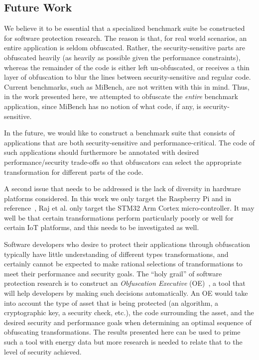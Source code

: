 \subsection{Future Work}
We believe it to be essential that a specialized benchmark suite be constructed for software protection research. The reason is that, for real world scenarios, an entire application is seldom obfuscated. Rather, the security-sensitive parts are obfuscated heavily (as heavily as possible given the performance constraints), whereas the remainder of the code is either left un-obfuscated, or receives a thin layer of obfuscation to blur the lines between security-sensitive and regular code. Current benchmarks, such as MiBench, are not written with this in mind. Thus, in the work presented here, we attempted to obfuscate the {\em entire} benchmark application, since MiBench has no notion of what code, if any, is security-sensitive. 

In the future, we would like to construct a benchmark suite that consists of applications that are both security-sensitive and performance-critical. The code of such applications should furthermore be annotated with desired performance/security trade-offs so that obfuscators can select the appropriate transformation for different parts of the code.

A second issue that needs to be addressed is the lack of diversity in hardware platforms considered. In this work we only target the Raspberry Pi and in reference~\cite{raj2017modelling}, Raj et al. 
only target the STM32 Arm Cortex micro-controller. It may well be that certain transformations perform particularly poorly or well for certain IoT platforms, and this needs to be investigated as well.

Software developers who desire to protect their applications through obfuscation typically have little understanding of different types transformations, and certainly cannot be expected to make rational selections of transformations to meet their performance and security goals. The ``holy grail'' of software protection research is to construct an {\em Obfuscation Executive} (OE)~\cite{heffner,Holder:2017}, a tool that will help developers by making such decisions automatically. An OE would take into account the type of asset that is being protected (an algorithm, a cryptographic key, a security check, etc.), the code surrounding the asset, and the desired security and performance goals when determining an optimal sequence of  obfuscating transformations. The results presented here can be used to prime such a tool with energy data but more research is needed to relate that to the level of security achieved. 

